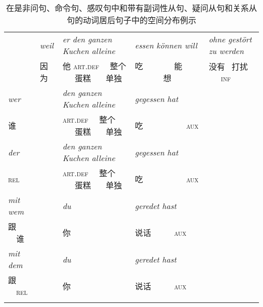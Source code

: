 \begin{table}
\begin{sideways}
{\begin{tabular}{l@{~}l@{~}l@{~}l@{~}l}
       & \emph{weil}          & \emph{er den ganzen Kuchen alleine}               & \emph{essen können will}   & \emph{ohne gestört zu werden}    \\
        & 因为       & 他 \textsc{art}.\textsc{def} \ \ 整个 \ \ \ 蛋糕 \ \ \  单独            & 吃 \ \ \ \ \ \ \  能 \ \ \ \ \ \ \ 想    & 没有 \  打扰 \ \ \ \textsc{inf} \passive{}\\%
%
\emph{wer}     &               & \emph{den ganzen Kuchen alleine}                  & \emph{gegessen hat} \\
	谁     &               & \textsc{art}.\textsc{def} \ \ 整个 \ \ \ 蛋糕 \ \ \ 单独              & 吃 \ \ \ \  \ \ \ \ \ \ \textsc{aux}\\%
%
\emph{der}     &               & \emph{den ganzen Kuchen alleine}                  & \emph{gegessen hat} \\
\textsc{rel}     &               & \textsc{art}.\textsc{def} \ \ 整个 \ \ \ 蛋糕 \ \ \ 单独              & 吃 \ \ \ \ \ \ \ \ \ \ \textsc{aux}\\%
%
\emph{mit wem} &               & \emph{du}                                     & \emph{geredet hast}\\
	跟 \ \ 谁 &             & 你                                    & 说话 \ \ \ \ \ \textsc{aux}\\%

\emph{mit dem} &               & \emph{du}                                     & \emph{geredet hast}\\
	跟 \ \ \textsc{rel} &             & 你                                    & 说话 \ \ \ \ \  \textsc{aux}\\\lspbottomrule
\end{tabular}
}
\end{sideways}
\caption{\label{bsp-topo-two}在是非问句、命令句、感叹句中和带有副词性从句、疑问从句和关系从句的动词居后句子中的空间分布例示}
\end{table}
